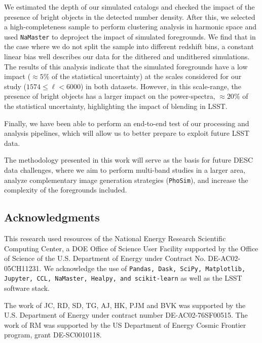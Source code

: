 \documentclass[twocolumn]{aastex62}
\begin{document}
We estimated the depth of our simulated catalogs and checked the impact of the presence of bright objects in the detected number density. After this, we selected a high-completeness sample to perform clustering analysis in harmonic space and used \texttt{NaMaster} to deproject the impact of simulated foregrounds. We find that in the case where we do not split the sample into different redshift bins, a constant linear bias well describes our data for the dithered and undithered simulations. The results of this analysis indicate that the simulated foregrounds have a low impact ($\approx 5\%$ of the statistical uncertainty) at the scales considered for our study ($1574 \leq \ell < 6000$) in both datasets. However, in this scale-range, the presence of bright objects has a larger impact on the power-spectra, $\approx 20\%$ of the statistical uncertainty, highlighting the impact of blending in LSST. 

Finally, we have been able to perform an end-to-end test of our processing and analysis pipelines, which will allow us to better prepare to exploit future LSST data.

The methodology presented in this work will serve as the basis for future DESC data challenges, where we aim to perform multi-band studies in a larger area, analyze complementary image generation strategies (\texttt{PhoSim}), and increase the complexity of the foregrounds included.


\subsection*{Acknowledgments}

This research used resources of the National Energy Research Scientific Computing Center, a DOE Office of Science User Facility supported by the Office of Science of the U.S. Department of Energy under Contract No. DE-AC02-05CH11231. We acknowledge the use of \texttt{Pandas, Dask, SciPy, Matplotlib, Jupyter, CCL, NaMaster, Healpy, and scikit-learn} as well as the LSST software stack.

The work of JC, RD, SD, TG, AJ, HK, PJM and BVK was supported by the U.S. Department of Energy under contract number DE-AC02-76SF00515. 
The work of RM was supported by the US Department of Energy Cosmic Frontier program, grant DE-SC0010118.




\end{document}
